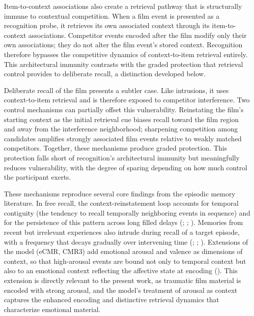 \documentclass[
  man,
  floatsintext,
  longtable,
  nolmodern,
  notxfonts,
  notimes,
  draftfirst,
  colorlinks=true,linkcolor=blue,citecolor=blue,urlcolor=blue]{apa7}
\begin{document}
Item-to-context associations also create a retrieval pathway that is
structurally immune to contextual competition. When a film event is
presented as a recognition probe, it retrieves its own associated
context through its item-to-context associations. Competitor events
encoded after the film modify only their own associations; they do not
alter the film event's stored context. Recognition therefore bypasses
the competitive dynamics of context-to-item retrieval entirely. This
architectural immunity contrasts with the graded protection that
retrieval control provides to deliberate recall, a distinction developed
below.

Deliberate recall of the film presents a subtler case. Like intrusions,
it uses context-to-item retrieval and is therefore exposed to competitor
interference. Two control mechanisms can partially offset this
vulnerability. Reinstating the film's starting context as the initial
retrieval cue biases recall toward the film region and away from the
interference neighborhood; sharpening competition among candidates
amplifies strongly associated film events relative to weakly matched
competitors. Together, these mechanisms produce graded protection. This
protection falls short of recognition's architectural immunity but
meaningfully reduces vulnerability, with the degree of sparing depending
on how much control the participant exerts.

These mechanisms reproduce several core findings from the episodic
memory literature. In free recall, the context-reinstatement loop
accounts for temporal contiguity (the tendency to recall temporally
neighboring events in sequence) and for the persistence of this pattern
across long filled delays (; ;
). Memories
from recent but irrelevant experiences also intrude during recall of a
target episode, with a frequency that decays gradually over intervening
time (;
;
). Extensions of
the model (eCMR, CMR3) add emotional arousal and valence as dimensions
of context, so that high-arousal events are bound not only to temporal
context but also to an emotional context reflecting the affective state
at encoding ().
This extension is directly relevant to the present work, as traumatic
film material is encoded with strong arousal, and the model's treatment
of arousal as context captures the enhanced encoding and distinctive
retrieval dynamics that characterize emotional material.
\end{document}
